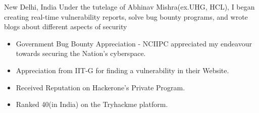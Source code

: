 \documentclass[10pt,a4paper,ragged2e]{altacv}
\begin{document}
\divider

  {New Delhi, India}
Under the tutelage of Abhinav Mishra(ex.UHG, HCL), I began creating real-time vulnerability reports, solve bug bounty programs, and wrote blogs about different aspects of security

\divider

\begin{itemize}
\item Government Bug Bounty Appreciation - NCIIPC appreciated my endeavour towards securing the Nation's cyberspace.
\item Appreciation from IIT-G for finding a vulnerability in their Website.
\item Received Reputation on Hackerone's Private Program.
\item Ranked 40(in India) on the Tryhackme platform.
\end{itemize}




\clearpage


\nocite{*}

\end{document}
